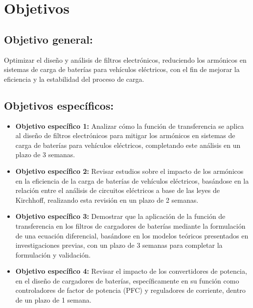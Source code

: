 \section{Objetivos}

\subsection*{Objetivo general:}
Optimizar el diseño y análisis de filtros electrónicos, reduciendo los armónicos en sistemas de carga de baterías para vehículos eléctricos, con el fin de mejorar la eficiencia y la estabilidad del proceso de carga.

\subsection*{Objetivos específicos:}
\begin{itemize}
    \item \textbf{Objetivo específico 1:} Analizar cómo la función de transferencia se aplica al diseño de filtros electrónicos para mitigar los armónicos en sistemas de carga de baterías para vehículos eléctricos, completando este análisis en un plazo de 3 semanas.

    \item \textbf{Objetivo específico 2:} Revisar estudios sobre el impacto de los armónicos en la eficiencia de la carga de baterías de vehículos eléctricos, basándose en la relación entre el análisis de circuitos eléctricos a base de las leyes de Kirchhoff, realizando esta revisión en un plazo de 2 semanas.

    \item \textbf{Objetivo específico 3:} Demostrar que la aplicación de la función de transferencia en los filtros de cargadores de baterías mediante la formulación de una ecuación diferencial, basándose en los modelos teóricos presentados en investigaciones previas, con un plazo de 3 semanas para completar la formulación y validación.

    \item \textbf{Objetivo específico 4:} Revisar el impacto de los convertidores de potencia, en el diseño de cargadores de baterías, específicamente en su función como controladores de factor de potencia (PFC) y reguladores de corriente, dentro de un plazo de 1 semana.
\end{itemize}